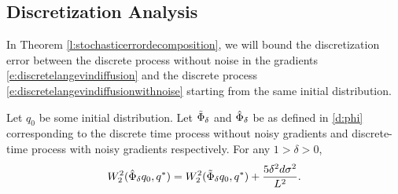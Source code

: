 \subsection{Discretization Analysis}
In Theorem \ref{l:stochasticerrordecomposition}, we will bound the discretization error between the discrete process without noise in the gradients \eqref{e:discretelangevindiffusion} and the discrete process \eqref{e:discretelangevindiffusionwithnoise} starting from the same initial distribution.
\begin{lemma}\label{l:stochasticerrordecomposition}
Let $q_0$ be some initial distribution. Let $\tilde{\Phi}_\delta$ and $\hat{\Phi}_\delta$ be as defined in \eqref{d:phi} corresponding to the discrete time process without noisy gradients and discrete-time process with noisy gradients respectively. For any $1>\delta>0$, 
$$W_2^2(\hat{\Phi}_\delta q_0,q^*) = W_2^2(\tilde{\Phi}_\delta q_0, q^*) + \frac{5\delta^2d\sigma^2}{L^2}.$$
\end{lemma}
